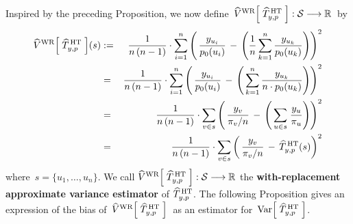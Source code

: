 \vskip 0.5cm
\noindent
Inspired by the preceding Proposition, we now define
\,$\widehat{V}^{\textnormal{WR}}\!\left[\;\widehat{T}^{\,\textnormal{HT}}_{y,p}\;\right]
: \mathcal{S} \longrightarrow \Re$\,
by
\begin{eqnarray*}
\widehat{V}^{\textnormal{WR}}\!\left[\;\widehat{T}^{\,\textnormal{HT}}_{y,p}\;\right]\!(s)
& := &
	\dfrac{1}{n\,(n-1)}\cdot\overset{n}{\underset{i = 1}{\sum}}\left(\,
		\dfrac{y_{u_{i}}}{p_{0}(u_{i})}
		\, - \,
		\left(\dfrac{1}{n}\,\overset{n}{\underset{k=1}{\sum}}\,\dfrac{y_{u_{k}}}{p_{0}(u_{k})}\right)
		\right)^{2}
\\
& = &
	\dfrac{1}{n\,(n-1)}\cdot\overset{n}{\underset{i = 1}{\sum}}\left(\,
		\dfrac{y_{u_{i}}}{p_{0}(u_{i})}
		\, - \,
		\left(\,\overset{n}{\underset{k=1}{\sum}}\,\dfrac{y_{u_{k}}}{n \cdot p_{0}(u_{k})}\right)
		\right)^{2}
\\
& = &
	\dfrac{1}{n\,(n-1)}\cdot \underset{v \in s}{\sum} \left(\,
		\dfrac{y_{v}}{\pi_{v}/n}
		\, - \,
		\left(\,\underset{u \in s}{\sum}\;\dfrac{y_{u}}{\pi_{u}}\right)
		\right)^{2}
\\
& = &
	\dfrac{1}{n\,(n-1)}\cdot \underset{v \in s}{\sum} \left(\,
		\dfrac{y_{v}}{\pi_{v}/n}
		\, - \,
		\widehat{T}^{\,\textnormal{HT}}_{y,p}(s)
		\right)^{2}
\end{eqnarray*}
where \,$s = \{u_{1},\ldots,u_{n}\}$.
We call
\;$\widehat{V}^{\textnormal{WR}}\!\left[\;\widehat{T}^{\,\textnormal{HT}}_{y,p}\;\right]
: \mathcal{S} \longrightarrow \Re$\;
the \textbf{with-replacement approximate variance estimator}
of \;$\widehat{T}^{\,\textnormal{HT}}_{y,p}$.
The following Proposition gives an expression of the bias of
\,$\widehat{V}^{\textnormal{WR}}\!\left[\;\widehat{T}^{\,\textnormal{HT}}_{y,p}\;\right]$\,
as an estimator for
\,$\Var\!\left[\;\widehat{T}^{\,\textnormal{HT}}_{y,p}\;\right]$.

